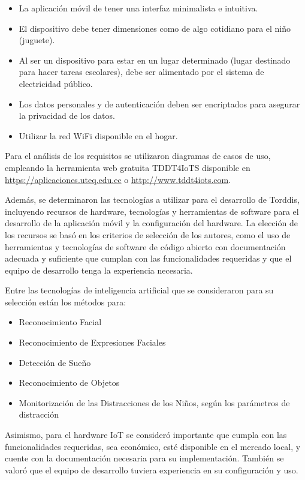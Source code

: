 \documentclass[a4paper,fleqn]{cas-sc}
\begin{document}
					\begin{itemize}
						\item La aplicación móvil de tener una interfaz minimalista e intuitiva.
						\item El dispositivo debe tener dimensiones como de algo cotidiano para el niño (juguete).
						\item Al ser un dispositivo para estar en un lugar determinado (lugar destinado para hacer tareas escolares), debe ser alimentado por el sistema de electricidad público.
						\item Los datos personales y de autenticación deben ser encriptados para asegurar la privacidad de los datos.
						\item Utilizar la red WiFi disponible en el hogar.
					\end{itemize}
					
					Para el análisis de los requisitos se utilizaron diagramas de casos de uso, empleando la herramienta web gratuita TDDT4IoTS disponible en \href{https://aplicaciones.uteq.edu.ec}{https://aplicaciones.uteq.edu.ec} o \href{http://www.tddt4iots.com}{http://www.tddt4iots.com}. 
					
					Además, se determinaron las tecnologías a utilizar para el desarrollo de Torddis, incluyendo recursos de hardware, tecnologías y herramientas de software para el desarrollo de la aplicación móvil y la configuración del hardware. La elección de los recursos se basó en los criterios de selección de los autores, como el uso de herramientas y tecnologías de software de código abierto con documentación adecuada y suficiente que cumplan con las funcionalidades requeridas y que el equipo de desarrollo tenga la experiencia necesaria.
					
					Entre las tecnologías de inteligencia artificial que se consideraron para su selección están los métodos para:
					
					\begin{itemize}
						\item Reconocimiento Facial
						\item Reconocimiento de Expresiones Faciales
						\item Detección de Sueño
						\item Reconocimiento de Objetos
						\item Monitorización de las Distracciones de los Niños, según los parámetros de distracción
					\end{itemize} 
					Asimismo, para el hardware IoT se consideró importante que cumpla con las funcionalidades requeridas, sea económico, esté disponible en el mercado local, y cuente con la documentación necesaria para su implementación. También se valoró que el equipo de desarrollo tuviera experiencia en su configuración y uso.
					
\end{document}
